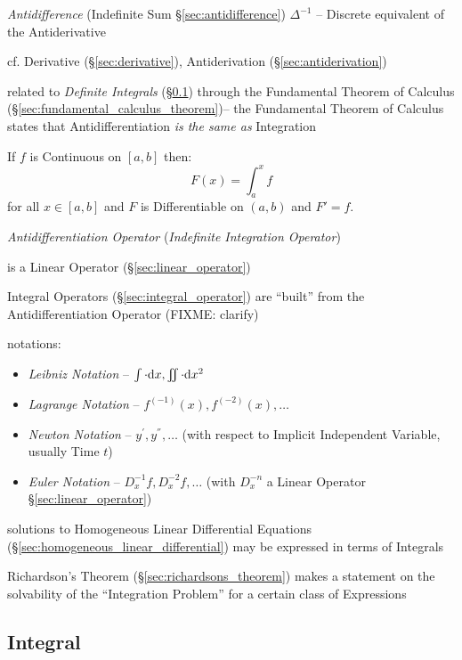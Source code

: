 \fist \emph{Antidifference} (Indefinite Sum \S\ref{sec:antidifference})
$\Delta^{-1}$ -- Discrete equivalent of the Antiderivative

\fist cf. Derivative (\S\ref{sec:derivative}), Antiderivation
(\S\ref{sec:antiderivation})

\fist related to \emph{Definite Integrals} (\S\ref{sec:integral}) through the
Fundamental Theorem of Calculus (\S\ref{sec:fundamental_calculus_theorem})-- the
Fundamental Theorem of Calculus states that Antidifferentiation \emph{is the
  same as} Integration

If $f$ is Continuous on $[a,b]$ then:
\[
  F(x) = \int_a^x f
\]
for all $x \in [a,b]$ and $F$ is Differentiable on $(a,b)$ and $F' = f$.

\emph{Antidifferentiation Operator} (\emph{Indefinite Integration Operator})

is a Linear Operator (\S\ref{sec:linear_operator})

\fist Integral Operators (\S\ref{sec:integral_operator}) are ``built'' from the
Antidifferentiation Operator (FIXME: clarify)

notations:
\begin{itemize}
  \item \emph{Leibniz Notation} --
    $\int \cdot \mathrm{d}x, \iint \cdot \mathrm{d}x^2$
  \item \emph{Lagrange Notation} -- $f^{(-1)}(x), f^{(-2)}(x), \ldots$
  \item \emph{Newton Notation} -- $y^{'}, y^{''}, \ldots$ (with respect
    to Implicit Independent Variable, usually Time $t$)
  \item \emph{Euler Notation} -- $D^{-1}_x{f}, D^{-2}_x{f}, \ldots$ (with
    $D_x^{-n}$ a Linear  Operator \S\ref{sec:linear_operator})
\end{itemize}

solutions to Homogeneous Linear Differential Equations
(\S\ref{sec:homogeneous_linear_differential}) may be expressed in
terms of Integrals

Richardson's Theorem (\S\ref{sec:richardsons_theorem}) makes a statement on the
solvability of the ``Integration Problem'' for a certain class of Expressions



\subsection{Integral}\label{sec:integral}


